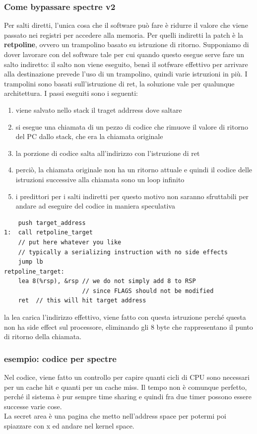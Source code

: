 \documentclass[12pt, oneside]{extbook}
\begin{document}
\subsubsection{Come bypassare spectre v2}
Per salti diretti, l'unica cosa che il software può fare è ridurre il valore che viene passato nei registri per accedere alla memoria. Per quelli indiretti la patch è la \textbf{retpoline}, ovvero un trampolino basato su istruzione di ritorno. Supponiamo di dover lavorare con del software tale per cui quando questo esegue serve fare un salto indiretto: il salto non viene eseguito, bensì il sotfware effettivo per arrivare alla destinazione prevede l'uso di un trampolino, quindi varie istruzioni in più. I trampolini sono basati sull'istruzione di \textsf{ret}, la soluzione vale per qualunque architettura. I passi eseguiti sono i seguenti:
\begin{enumerate}
\item viene salvato nello stack il traget addrress dove saltare
\item si esegue una chiamata di un pezzo di codice che rimuove il valore di ritorno del PC dallo stack, che era la chiamata originale
\item la porzione di codice salta all'indirizzo con l'istruzione di \textsf{ret}
\item perciò, la chiamata originale non ha un ritorno attuale e quindi il codice delle istruzioni successive alla chiamata sono un loop infinito
\item i predittori per i salti indiretti per questo motivo non saranno sfruttabili per andare ad eseguire del codice in maniera speculativa
\end{enumerate}
\begin{lstlisting}
	push target_address
1:	call retpoline_target
	// put here whatever you like
	// typically a serializing instruction with no side effects
	jump lb
retpoline_target:
	lea 8(%rsp), &rsp // we do not simply add 8 to RSP
					  // since FLAGS should not be modified
	ret  // this will hit target address
\end{lstlisting}
la \textsf{lea} carica l'indirizzo effettivo, viene fatto con questa istruzione perché questa non ha side effect sul processore, eliminando gli 8 byte che rappresentano il punto di ritorno della chiamata.\\ 
\subsubsection{esempio: codice per spectre}
Nel codice, viene fatto un controllo per capire quanti cicli di CPU sono necessari per un cache hit e quanti per un cache miss. Il tempo non è comunque perfetto, perché il sistema è pur sempre time sharing e quindi fra due timer possono essere successe varie cose.\\ La secret area è una pagina che metto nell'address space per potermi poi spiazzare con x ed andare nel kernel space.
\end{document}
